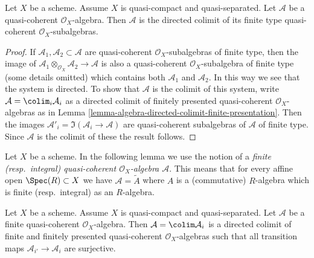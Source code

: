 \begin{lemma}
\label{lemma-algebra-directed-colimit-finite-type}
Let $X$ be a scheme. Assume $X$ is quasi-compact and quasi-separated.
Let $\mathcal{A}$ be a quasi-coherent $\mathcal{O}_X$-algebra.
Then $\mathcal{A}$ is the directed colimit of its finite type
quasi-coherent $\mathcal{O}_X$-subalgebras.
\end{lemma}

\begin{proof}
If $\mathcal{A}_1, \mathcal{A}_2 \subset \mathcal{A}$ are
quasi-coherent $\mathcal{O}_X$-subalgebras of finite type, then the image of
$\mathcal{A}_1 \otimes_{\mathcal{O}_X} \mathcal{A}_2 \to \mathcal{A}$
is also a quasi-coherent $\mathcal{O}_X$-subalgebra of finite type
(some details omitted) which contains both $\mathcal{A}_1$ and $\mathcal{A}_2$.
In this way we see that the system is directed.
To show that $\mathcal{A}$ is the colimit of this system, write
$\mathcal{A} = \colim_i \mathcal{A}_i$ as a directed
colimit of finitely presented quasi-coherent $\mathcal{O}_X$-algebras as in
Lemma \ref{lemma-algebra-directed-colimit-finite-presentation}.
Then the images $\mathcal{A}'_i = \Im(\mathcal{A}_i \to \mathcal{A})$ are
quasi-coherent subalgebras of $\mathcal{A}$ of finite type. Since
$\mathcal{A}$ is the colimit of these the result follows.
\end{proof}

\noindent
Let $X$ be a scheme. In the following lemma we use the notion
of a {\it finite (resp.\ integral) quasi-coherent
$\mathcal{O}_X$-algebra $\mathcal{A}$}. This means that for every
affine open $\Spec(R) \subset X$ we have
$\mathcal{A} = \widetilde{A}$ where $A$ is a (commutative) $R$-algebra
which is finite (resp.\ integral) as an $R$-algebra.

\begin{lemma}
\label{lemma-finite-algebra-directed-colimit-finite-finitely-presented}
Let $X$ be a scheme. Assume $X$ is quasi-compact and quasi-separated.
Let $\mathcal{A}$ be a finite quasi-coherent $\mathcal{O}_X$-algebra.
Then $\mathcal{A} = \colim \mathcal{A}_i$ is a directed colimit of finite
and finitely presented quasi-coherent $\mathcal{O}_X$-algebras
such that all transition maps $\mathcal{A}_{i'} \to \mathcal{A}_i$
are surjective.
\end{lemma}

